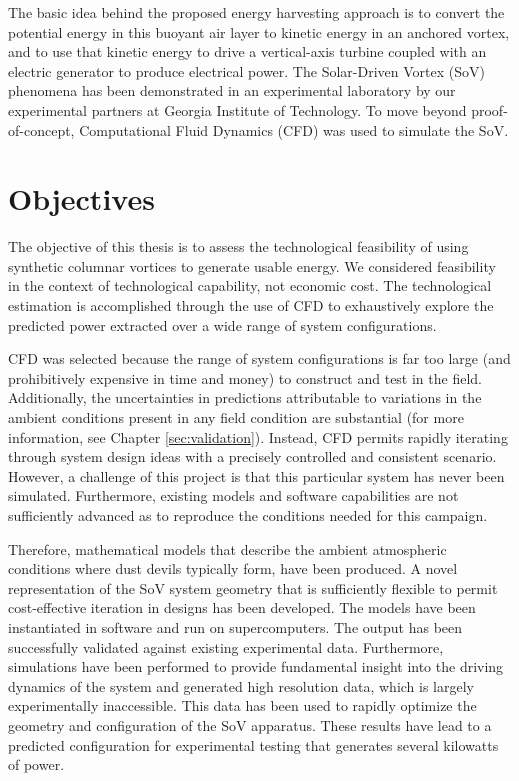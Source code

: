 The basic idea behind the proposed energy harvesting approach is to
convert the potential energy in this buoyant air layer to kinetic energy
in an anchored vortex, and to use that kinetic energy to drive a
vertical-axis turbine coupled with an electric generator to
produce electrical power. 
The Solar-Driven Vortex (SoV) phenomena has been demonstrated in
an experimental laboratory by our experimental partners at Georgia
Institute of Technology\cite{mark-thesis}. To move beyond
proof-of-concept, Computational Fluid Dynamics (CFD) was used to
simulate the SoV.  


\section{Objectives}

The objective of this thesis is to assess the technological feasibility
of using synthetic columnar vortices to generate usable energy. 
We considered feasibility in the context of technological capability,
not economic cost. The technological estimation is accomplished through
the use of CFD to exhaustively explore the predicted power extracted
over a wide range of system configurations. 

CFD was selected because the range of system configurations is far too
large (and prohibitively expensive in time and money) to construct and
test in the field. Additionally, the uncertainties in predictions
attributable to variations in the ambient conditions present in any field
condition are substantial (for more information, see Chapter
\ref{sec:validation}). Instead, CFD permits rapidly iterating 
through system design ideas with a precisely controlled and consistent
scenario. However, a challenge of this project is that this particular
system has never been simulated. Furthermore, existing models and
software capabilities are not sufficiently advanced as to reproduce the 
conditions needed for this campaign. 

Therefore, mathematical models that describe the ambient atmospheric 
conditions where dust devils typically form, have been produced. A novel 
representation of the SoV system geometry that is sufficiently flexible
to permit cost-effective iteration in designs has been developed. The
models have been instantiated in software and run on supercomputers. 
The output has been successfully validated against existing experimental
data. Furthermore, simulations have been performed to provide
fundamental insight into the driving dynamics of the system and
generated high resolution data, which is largely experimentally
inaccessible. This data has been used to rapidly optimize the geometry
and configuration of the SoV apparatus. These results have lead to a 
predicted configuration for experimental testing that generates several
kilowatts of power. 

